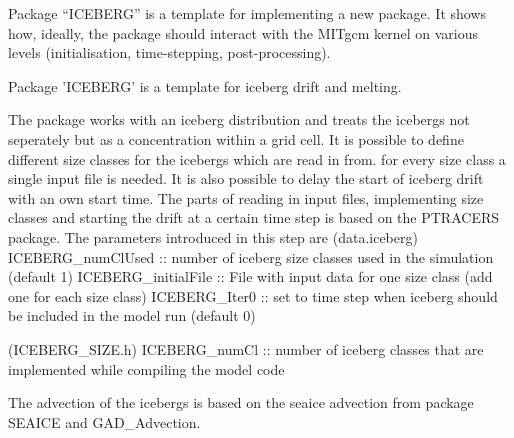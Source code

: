
Package ``ICEBERG'' is a template for implementing a new package.
It shows how, ideally, the package should interact with the
MITgcm kernel on various levels (initialisation, time-stepping,
post-processing).

Package 'ICEBERG' is a template for iceberg drift and melting.

The package works with an iceberg distribution and treats the icebergs not seperately but as a concentration
within a grid cell.
It is possible to define different size classes for the icebergs which are read in from.
for every size class a single input file is needed.
It is also possible to delay the start of iceberg drift with an own start time.
The parts of reading in input files, implementing size classes and starting the
drift at a certain time step is based on the PTRACERS package.
The parameters introduced in this step are
(data.iceberg)
ICEBERG_numClUsed  ::  number of iceberg size classes used in the simulation (default 1)
ICEBERG_initialFile  ::  File with input data for one size class (add one for each size class)
ICEBERG_Iter0  ::  set to time step when iceberg should be included in the model run (default 0)

(ICEBERG_SIZE.h)
ICEBERG_numCl  ::  number of iceberg classes that are implemented while compiling the model code



The advection of the icebergs is based on the seaice advection from package SEAICE
and GAD_Advection.

